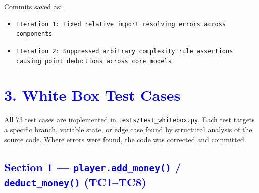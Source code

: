 \documentclass{article}
\begin{document}
Commits saved as:
\begin{itemize}[noitemsep]
  \item \texttt{Iteration 1: Fixed relative import resolving errors across components}
  \item \texttt{Iteration 2: Suppressed arbitrary complexity rule assertions causing point deductions across core models}
\end{itemize}

\section*{\textcolor{blue}{3. White Box Test Cases}}

All 73 test cases are implemented in \texttt{tests/test\_whitebox.py}. Each test targets a specific branch, variable state, or edge case found by structural analysis of the source code. Where errors were found, the code was corrected and committed.

\renewcommand{\labelitemi}{\textcolor{blue}{$\bullet$}}

\subsection*{\textcolor{blue}{Section 1 — \texttt{player.add\_money()} / \texttt{deduct\_money()} (TC1–TC8)}}
\end{document}

